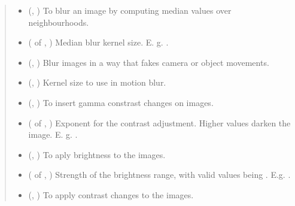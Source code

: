 \documentclass[letterpaper,10pt,english]{sphinxmanual}
\begin{document}
\begin{fulllineitems}
\begin{quote}
\begin{description}
\begin{itemize}
\item {} 
 (, ) \textendash{} To blur an image by computing median values over neighbourhoods.

\item {} 
 ( of , ) \textendash{} Median blur kernel size. E. g. .

\item {} 
 (, ) \textendash{} Blur images in a way that fakes camera or object movements.

\item {} 
 (, ) \textendash{} Kernel size to use in motion blur.

\item {} 
 (, ) \textendash{} To insert gamma constrast changes on images.

\item {} 
 ( of , ) \textendash{} Exponent for the contrast adjustment. Higher values darken the image. E. g. .

\item {} 
 (, ) \textendash{} To aply brightness to the images.

\item {} 
 ( of , ) \textendash{} Strength of the brightness range, with valid values being . E.g. .

\item {} 
 (, ) \textendash{} To apply contrast changes to the images.


\end{itemize}
\end{description}
\end{quote}
\end{fulllineitems}
\end{document}
